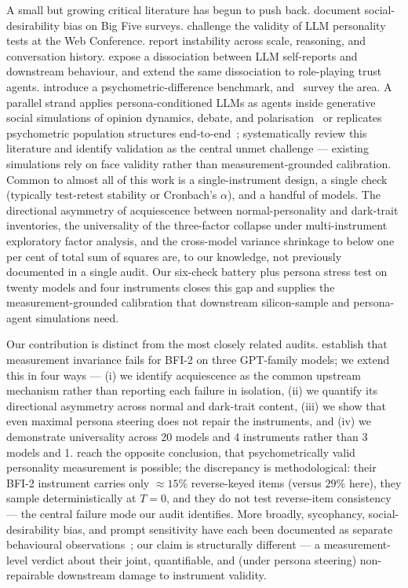 \documentclass[11pt]{article}
\begin{document}
A small but growing critical literature has begun to push back. \citet{salecha2024llm} document social-desirability bias on Big Five surveys. \citet{suhr2025challenging} challenge the validity of LLM personality tests at the Web Conference. \citet{pelet2025persistent} report instability across scale, reasoning, and conversation history. \citet{han2025personality} expose a dissociation between LLM self-reports and downstream behaviour, and \citet{mannekote2025roleplaying} extend the same dissociation to role-playing trust agents. \citet{xie2025aipsychobench} introduce a psychometric-difference benchmark, and~\citet{chen2025humanizing} survey the area. A parallel strand applies persona-conditioned LLMs as agents inside generative social simulations of opinion dynamics, debate, and polarisation~\citep{chuang2023simulating,cau2025language,chuang2025debate} or replicates psychometric population structures end-to-end~\citep{ferreira2025matching}; \citet{larooij2025validation} systematically review this literature and identify validation as the central unmet challenge --- existing simulations rely on face validity rather than measurement-grounded calibration. Common to almost all of this work is a single-instrument design, a single check (typically test-retest stability or Cronbach's $\alpha$), and a handful of models. The directional asymmetry of acquiescence between normal-personality and dark-trait inventories, the universality of the three-factor collapse under multi-instrument exploratory factor analysis, and the cross-model variance shrinkage to below one per cent of total sum of squares are, to our knowledge, not previously documented in a single audit. Our six-check battery plus persona stress test on twenty models and four instruments closes this gap and supplies the measurement-grounded calibration that downstream silicon-sample and persona-agent simulations need.

Our contribution is distinct from the most closely related audits. \citet{suhr2025challenging} establish that measurement invariance fails for BFI-2 on three GPT-family models; we extend this in four ways --- (i) we identify acquiescence as the common upstream mechanism rather than reporting each failure in isolation, (ii) we quantify its directional asymmetry across normal and dark-trait content, (iii) we show that even maximal persona steering does not repair the instruments, and (iv) we demonstrate universality across 20 models and 4 instruments rather than 3 models and 1. \citet{serapio2025psychometric} reach the opposite conclusion, that psychometrically valid personality measurement is possible; the discrepancy is methodological: their BFI-2 instrument carries only $\approx15\%$ reverse-keyed items (versus $29\%$ here), they sample deterministically at $T{=}0$, and they do not test reverse-item consistency --- the central failure mode our audit identifies. More broadly, sycophancy, social-desirability bias, and prompt sensitivity have each been documented as separate behavioural observations~\citep{perez2023discovering,sharma2024sycophancy,salecha2024llm}; our claim is structurally different --- a measurement-level verdict about their joint, quantifiable, and (under persona steering) non-repairable downstream damage to instrument validity.
\end{document}
